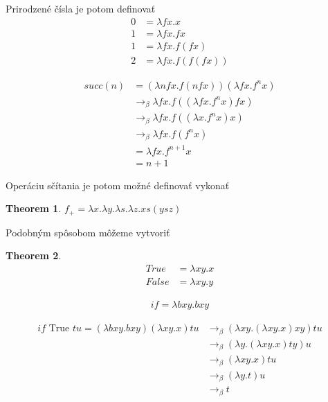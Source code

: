 \documentclass[a4paper,10pt,oneside]{report}%
\newtheorem{theorem}{Theorem}
\begin{document}
Prirodzené čísla je potom definovať 
\begin{align*}
    0 &= \lambda f x . x \\
    1 &= \lambda f x . f x \\
    1 &= \lambda f x . f (f x) \\
    2 &= \lambda f x . f ( f (f x))
\end{align*}

\begin{align*}
    succ(n) &=           (\lambda n f x .  f( n f x ))(\lambda f x . f^{n} x) \\
           &\to_{\beta} \lambda f x . f (( \lambda f x . f^{n} x ) f x)      \\
           &\to_{\beta} \lambda f x . f (( \lambda x . f^{n} x) x)           \\
           &\to_{\beta} \lambda f x . f (f^{n} x)                            \\
           &=           \lambda f x . f^{n+1} x                              \\
           &= n + 1
\end{align*}

Operáciu sčítania je potom možné definovať vykonať
\begin{theorem}
    $f_{+} = \lambda x. \lambda y. \lambda s. \lambda z. x s (y s z)$
\end{theorem}

Podobným spôsobom môžeme vytvoriť 
\begin{theorem}
    \begin{align*}
        True &= \lambda x y . x \\
        False &= \lambda x y . y
    \end{align*}
\end{theorem}

\begin{align*}
    if = \lambda b x y . b x y
\end{align*}

\begin{align*}
    if \textrm{ True } t u = (\lambda bxy.bxy)(\lambda xy.x) tu & \to_{\beta} (\lambda xy.(\lambda xy.x)xy)tu \\
                                                     & \to_{\beta} (\lambda y.( \lambda xy.x)ty)u \\
                                                     & \to_{\beta} (\lambda xy.x)tu \\
                                                     & \to_{\beta} (\lambda y.t)u \\
                                                     & \to_{\beta} t
\end{align*}
\end{document}

